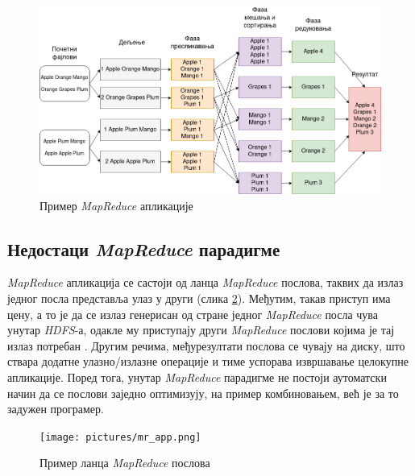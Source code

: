\documentclass[12pt,oneside]{memoir}
\begin{document}
\begin{figure}[!ht]
  \centering
  \includegraphics[width=1\textwidth]{pictures/mr_example_wordcount.png}
  \caption{Пример \textit{MapReduce} апликације}
  \label{fig:map_reduce}
\end{figure}


\subsection{Недостаци \textit{MapReduce} парадигме}
\label{subsec:nedost_mr}

\textit{MapReduce} апликација се састоји од ланца \textit{MapReduce} послова, таквих да излаз једног посла представља улаз у други (слика \ref{fig:mr_app_example}). Међутим, такав приступ има цену, а то је да се излаз генерисан од стране једног \textit{MapReduce} посла чува унутар \textit{HDFS}-а, одакле му приступају други \textit{MapReduce} послови којима је тај излаз потребан \cite{hadoop_learning}. Другим речима, међурезултати послова се чувају на диску, што ствара додатне улазно/излазне операције и тиме успорава извршавање целокупне апликације. Поред тога, унутар \textit{MapReduce} парадигме не постоји аутоматски начин да се послови заједно оптимизују, на пример комбиновањем, већ је за то задужен програмер.

\begin{figure}[!ht]
  \centering
  \texttt{[image: pictures/mr\_app.png]}
  \caption{Пример ланца \textit{MapReduce} послова}
  \label{fig:mr_app_example}
\end{figure}
\end{document}
